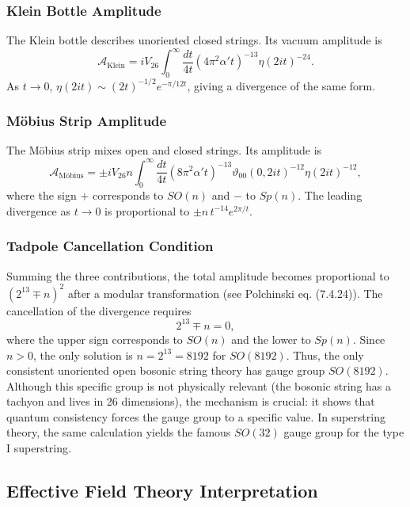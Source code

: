 \documentclass[11pt]{article}
\begin{document}
\subsubsection{Klein Bottle Amplitude}
The Klein bottle describes unoriented closed strings. Its vacuum amplitude is
\begin{equation}
\mathcal{A}_{\text{Klein}} = i V_{26} \int_0^\infty \frac{dt}{4t} (4\pi^2\alpha't)^{-13} \eta(2it)^{-24}.
\end{equation}
As $t\to 0$, $\eta(2it) \sim (2t)^{-1/2} e^{-\pi/12t}$, giving a divergence of the same form.

\subsubsection{Möbius Strip Amplitude}
The Möbius strip mixes open and closed strings. Its amplitude is
\begin{equation}
\mathcal{A}_{\text{Möbius}} = \pm i V_{26} n \int_0^\infty \frac{dt}{4t} (8\pi^2\alpha't)^{-13} \vartheta_{00}(0,2it)^{-12} \eta(2it)^{-12},
\end{equation}
where the sign $+$ corresponds to $SO(n)$ and $-$ to $Sp(n)$. The leading divergence as $t\to 0$ is proportional to $\pm n \, t^{-14} e^{2\pi/t}$.

\subsubsection{Tadpole Cancellation Condition}
Summing the three contributions, the total amplitude becomes proportional to $(2^{13} \mp n)^2$ after a modular transformation (see Polchinski eq. (7.4.24)). The cancellation of the divergence requires
\begin{equation}
2^{13} \mp n = 0,
\end{equation}
where the upper sign corresponds to $SO(n)$ and the lower to $Sp(n)$. Since $n>0$, the only solution is $n = 2^{13} = 8192$ for $SO(8192)$. Thus, the only consistent unoriented open bosonic string theory has gauge group $SO(8192)$. Although this specific group is not physically relevant (the bosonic string has a tachyon and lives in 26 dimensions), the mechanism is crucial: it shows that quantum consistency forces the gauge group to a specific value. In superstring theory, the same calculation yields the famous $SO(32)$ gauge group for the type I superstring.

\subsection{Effective Field Theory Interpretation}
\end{document}
